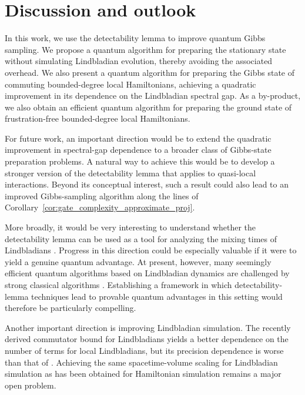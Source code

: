 \documentclass{article}
\theoremstyle{plain}
\theoremstyle{plain}
\theoremstyle{plain}
\theoremstyle{plain}
\theoremstyle{plain}
\theoremstyle{plain}
\theoremstyle{plain}
\begin{document}
\section{Discussion and outlook}

In this work, we use the detectability lemma to improve quantum Gibbs sampling. We propose a quantum algorithm for preparing the stationary state without simulating Lindbladian evolution, thereby avoiding the associated overhead. We also present a quantum algorithm for preparing the Gibbs state of commuting bounded-degree local Hamiltonians, achieving a quadratic improvement in its dependence on the Lindbladian spectral gap. As a by-product, we also obtain an efficient quantum algorithm for preparing the ground state of frustration-free bounded-degree local Hamiltonians.



For future work, an important direction would be to extend the quadratic improvement in spectral-gap dependence to a broader class of Gibbs-state preparation problems. A natural way to achieve this would be to develop a stronger version of the detectability lemma that applies to quasi-local interactions. Beyond its conceptual interest, such a result could also lead to an improved Gibbs-sampling algorithm along the lines of Corollary~\ref{cor:gate_complexity_approximate_proj}.

More broadly, it would be very interesting to understand whether the detectability lemma can be used as a tool for analyzing the mixing times of Lindbladians 
\cite{temme2014hypercontractivity,ding2024polynomial,bardet2024entropy,alicki2009thermalization,ramkumar2024mixing,KochanowskiAlhambraCapelRouze2024rapid,BardetCapelLiEtAl2023rapid,RouzeFrancaAlhambra2024optimal,capel2024quasi,kastoryano2013quantum,temme2015fast,ChenLiLuYing2024randomized,Rakovszky2024bottlenecks,LiLu2024quantum,Barthel2022solving,Fang2024mixing,DingLiLin2024efficient,DingChenLin2024single}.
Progress in this direction could be especially valuable if it were to yield a genuine quantum advantage. At present, however, many seemingly efficient quantum algorithms based on Lindbladian dynamics are challenged by strong classical algorithms \cite{BakshiLiuMoitraTang2024high,McDonoughYinLucasZhang2025lieb,RamkumarCaiTongJiang2025high,ChenRouzeEtAl2025convergence,ZlokapaKiani2026syk}. Establishing a framework in which detectability-lemma techniques lead to provable quantum advantages in this setting would therefore be particularly compelling.


Another important direction is improving Lindbladian simulation. The recently derived commutator bound for Lindbladians \cite{WangZhouEtAl2026lindbladian} yields a better dependence on the number of terms for local Lindbladians, but its precision dependence is worse than that of \cite{CleveWang2017}. Achieving the same spacetime-volume scaling for Lindbladian simulation as has been obtained for Hamiltonian simulation \cite{HaahHastingsKothariLow2021quantum,ChildsSuTranWiebeZhu2021theory} remains a major open problem.
\end{document}
